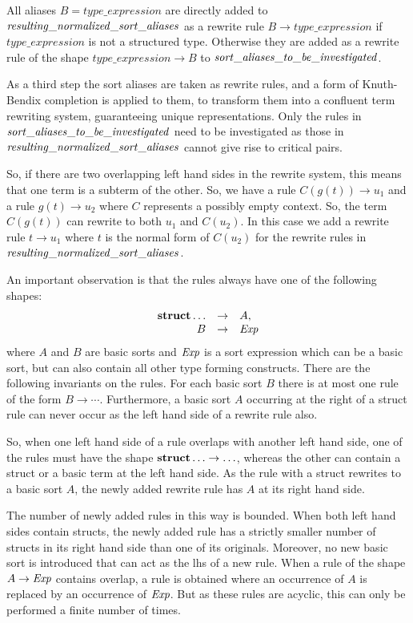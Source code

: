 \documentclass{article}
\begin{document}
All aliases $B = type\_expression$ are directly added to ${\it resulting\_normalized\_sort\_aliases}$
as a rewrite rule $B \rightarrow type\_expression$ 
if $type\_expression$ is not a structured type. Otherwise they are added as a rewrite
rule of the shape $type\_expression\rightarrow B$ to $\it sort\_aliases\_to\_be\_investigated$.  

As a third step the sort aliases are taken as rewrite rules, and 
a form of Knuth-Bendix completion is applied to them, to transform them
into a confluent term rewriting system, guaranteeing unique representations.
Only the rules in $\it sort\_aliases\_to\_be\_investigated$ need to be investigated as
those in ${\it resulting\_normalized\_sort\_aliases}$ cannot give rise to critical pairs. 

So, if there are two overlapping left hand sides in the rewrite system, this
means that one term is a subterm of the other. So, we have a rule 
$C(g(t))\rightarrow u_1$ and a rule $g(t)\rightarrow u_2$ where $C$ represents a
possibly empty context. So, the term
$C(g(t))$ can rewrite to both $u_1$ and $C(u_2)$. In this case we add
a rewrite rule $t\rightarrow u_1$ where $t$ is the normal form of $C(u_2)$ for
the rewrite rules in ${\it resulting\_normalized\_sort\_aliases}$. 

An important observation is that the rules always have one of the following 
shapes:
\[\begin{array}{rcl}
{\bf struct}\ldots  &\rightarrow& A,\\
B&\rightarrow & {\it Exp}
\end{array}\]
where $A$ and $B$ are basic sorts and ${\it Exp}$ is a sort expression which
can be a basic sort, but can also contain all other type forming constructs.
There are the following invariants on the rules. 
For each basic sort $B$ there is at most one rule of the form
$B\rightarrow \cdots$. Furthermore, a basic sort $A$ occurring at the right
of a struct rule can never occur as the left hand side of a rewrite rule also. 
 
So, when one left hand side of a rule overlaps with another left hand side, one of the rules
must have the shape ${\bf struct}\ldots \rightarrow\ldots$, whereas the other
can contain a struct or a basic term at the left hand side. As the rule with
a struct rewrites to a basic sort $A$, the newly added rewrite rule has $A$ at
its right hand side. 

The number of newly added rules in this way is bounded. When both left hand sides contain 
structs,
the newly added rule has a strictly smaller number of structs in its right hand side
than one of its originals. Moreover, no new basic sort is introduced that can 
act as the lhs of a new rule. When a rule of the shape $A\rightarrow {\it Exp}$ contains overlap,
a rule is obtained where an occurrence of $A$ is replaced by an occurrence of ${\it Exp}$.
But as these rules are acyclic, this can only be performed a finite number of times.
\end{document}
